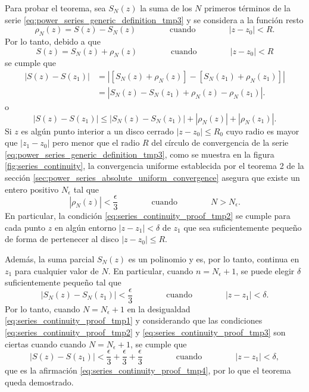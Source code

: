 \documentclass[a4paper]{report}
\begin{document}
Para probar el teorema, sea \(S_N(z)\) la suma de los \(N\) primeros términos de la serie \ref{eq:power_series_generic_definition_tmp3} y se considera a la función resto
\[
 \rho_N(z)=S(z)-S_N(z)
 \qquad\qquad\textrm{cuando}\qquad\qquad
 |z-z_0|<R.
\]
Por lo tanto, debido a que 
\[
 S(z)=S_N(z)+\rho_N(z)
 \qquad\qquad\textrm{cuando}\qquad\qquad
 |z-z_0|<R
\]
se cumple que 
\begin{align*}
 |S(z)-S(z_1)|&=\left|[S_N(z)+\rho_N(z)]-[S_N(z_1)+\rho_N(z_1)]\right|\\
   &=|S_N(z)-S_N(z_1)+\rho_N(z)-\rho_N(z_1)|.
\end{align*}
o
\begin{equation}\label{eq:series_continuity_proof_tmp1}
 |S(z)-S(z_1)|\leq|S_N(z)-S_N(z_1)|+|\rho_N(z)|+|\rho_N(z_1)|.
\end{equation}
Si \(z\) es algún punto interior a un disco cerrado \(|z-z_0|\leq R_0\) cuyo radio es mayor que \(|z_1-z_0|\) pero menor que el radio \(R\) del círculo de convergencia de la serie \ref{eq:power_series_generic_definition_tmp3}, como se muestra en la figura \ref{fig:series_continuity}, la convergencia uniforme establecida por el teorema 2 de la sección \ref{sec:power_series_absolute_uniform_convergence} asegura que existe un entero positivo \(N_\epsilon\) tal que
\begin{equation}\label{eq:series_continuity_proof_tmp2}
 |\rho_N(z)|<\frac{\epsilon}{3}
 \qquad\qquad\textrm{cuando}\qquad\qquad
 N>N_\epsilon. 
\end{equation}
En particular, la condición \ref{eq:series_continuity_proof_tmp2} se cumple para cada punto \(z\) en algún entorno \(|z-z_1|<\delta\) de \(z_1\) que sea suficientemente pequeño de forma de pertenecer al disco \(|z-z_0|\leq R\).

Además, la suma parcial \(S_N(z)\) es un polinomio y es, por lo tanto, continua en \(z_1\) para cualquier valor de \(N\). En particular, cuando \(n=N_\epsilon+1\), se puede elegir \(\delta\) suficientemente pequeño tal que 
\begin{equation}\label{eq:series_continuity_proof_tmp3}
 |S_N(z)-S_N(z_1)|<\frac{\epsilon}{3}
 \qquad\qquad\textrm{cuando}\qquad\qquad
 |z-z_1|<\delta. 
\end{equation}
Por lo tanto, cuando \(N=N_\epsilon+1\) en la desigualdad \ref{eq:series_continuity_proof_tmp1} y considerando que las condiciones \ref{eq:series_continuity_proof_tmp2} y \ref{eq:series_continuity_proof_tmp3} son ciertas cuando cuando \(N=N_\epsilon+1\), se cumple que 
\[
 |S(z)-S(z_1)|<\frac{\epsilon}{3}+\frac{\epsilon}{3}+\frac{\epsilon}{3}
 \qquad\qquad\textrm{cuando}\qquad\qquad
 |z-z_1|<\delta,
\]
que es la afirmación \ref{eq:series_continuity_proof_tmp4}, por lo que el teorema queda demostrado.
\end{document}
